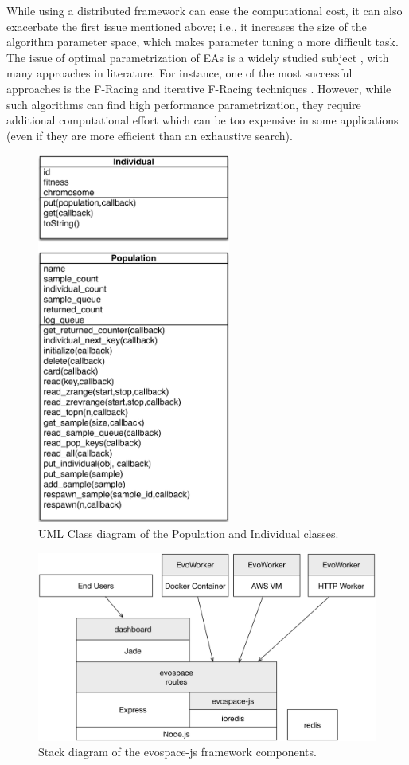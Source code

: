 While using a distributed framework can ease the computational cost, it can also exacerbate the first issue mentioned above;
i.e., it increases the size of the algorithm parameter space, which makes parameter tuning a more difficult task.
The issue of optimal parametrization of EAs is a widely studied subject \cite{de2007parameter}, 
with many approaches in literature. For instance, one of the most successful approaches 
is the F-Racing and iterative F-Racing techniques \cite{lopez2011irace}. 
However, while such algorithms can find high performance parametrization, 
they require additional computational effort which can be too expensive in some applications
(even if they are more efficient than an exhaustive search).

\begin{figure}[!t]
    \centering
        \includegraphics[width=2.5in]{img/classes.png}
    \caption{ UML Class diagram of the Population and Individual classes.}
    \label{fig:classes}
\end{figure}
%
\begin{figure}[!t]
    \centering
        \includegraphics[width=5.4in]{img/evospace-js.png}
    \caption{ Stack diagram of the evospace-js framework components.}
    \label{fig:stack}
\end{figure}

